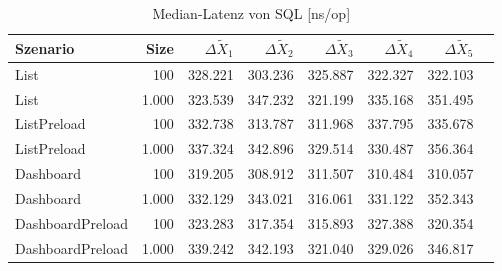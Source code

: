 
\begin{table}[ht]
\setlength{\extrarowheight}{-1pt}
\centering
\caption{Median-Latenz von SQL [ns/op]}
\begin{tabular}{lrrrrrrr}
\toprule
Szenario & Size & ${\Delta \tilde{X}_1}$ & ${\Delta \tilde{X}_2}$ & ${\Delta \tilde{X}_3}$ & ${\Delta \tilde{X}_4}$ & ${\Delta \tilde{X}_5}$ \\
\midrule
	List & 100 & \cellcolor{red!0}  328.221 & \cellcolor{red!0}  303.236 & \cellcolor{red!0}  325.887 & \cellcolor{red!0}  322.327 & \cellcolor{red!0}  322.103 \\
	List & 1.000 & \cellcolor{red!0}  323.539 & \cellcolor{red!0}  347.232 & \cellcolor{red!0}  321.199 & \cellcolor{red!0}  335.168 & \cellcolor{red!0}  351.495 \\
	ListPreload & 100 & \cellcolor{red!0}  332.738 & \cellcolor{red!0}  313.787 & \cellcolor{red!0}  311.968 & \cellcolor{red!0}  337.795 & \cellcolor{red!0}  335.678 \\
	ListPreload & 1.000 & \cellcolor{red!0}  337.324 & \cellcolor{red!0}  342.896 & \cellcolor{red!0}  329.514 & \cellcolor{red!0}  330.487 & \cellcolor{red!0}  356.364 \\
	Dashboard & 100 & \cellcolor{red!0}  319.205 & \cellcolor{red!0}  308.912 & \cellcolor{red!0}  311.507 & \cellcolor{red!0}  310.484 & \cellcolor{red!0}  310.057 \\
	Dashboard & 1.000 & \cellcolor{red!0}  332.129 & \cellcolor{red!0}  343.021 & \cellcolor{red!0}  316.061 & \cellcolor{red!0}  331.122 & \cellcolor{red!0}  352.343 \\
	DashboardPreload & 100 & \cellcolor{red!0}  323.283 & \cellcolor{red!0}  317.354 & \cellcolor{red!0}  315.893 & \cellcolor{red!0}  327.388 & \cellcolor{red!0}  320.354 \\
	DashboardPreload & 1.000 & \cellcolor{red!0}  339.242 & \cellcolor{red!0}  342.193 & \cellcolor{red!0}  321.040 & \cellcolor{red!0}  329.026 & \cellcolor{red!0}  346.817 \\
\bottomrule
\end{tabular}
\label{tab:latenz_sql}
\end{table}
	